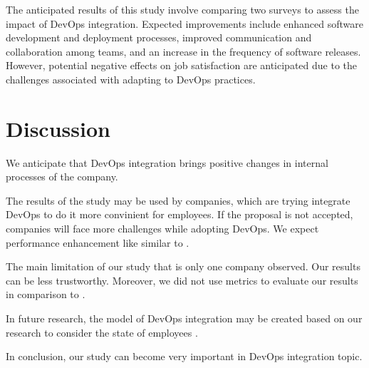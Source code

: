 \documentclass[oneside,final,12pt,a4paper]{extreport}
\begin{document}
The anticipated results of this study involve comparing two surveys to assess the impact of DevOps integration. Expected improvements include enhanced software development and deployment processes, improved communication and collaboration among teams, and an increase in the frequency of software releases. However, potential negative effects on job satisfaction are anticipated due to the challenges associated with adapting to DevOps practices.

\section{Discussion}

We anticipate that DevOps integration brings positive changes in internal processes of the company.

The results of the study may be used by companies, which are trying integrate DevOps to do it more convinient for employees. If the proposal is not accepted, companies will face more challenges while adopting DevOps. We expect performance enhancement like similar to \cite{21}.

The main limitation of our study that is only one company observed. Our results can be less trustworthy. Moreover, we did not use metrics to evaluate our results in comparison to \cite{15}.

In future research, the model of DevOps integration may be created based on our research to consider the state of employees \cite{16}.

In conclusion, our study can become very important in DevOps integration topic.


\newpage
\printbibliography[heading=bibintoc,title={References}]
\end{document}
